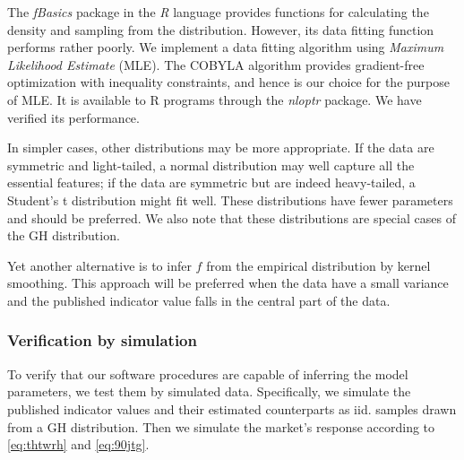 \documentclass[a4paper,11pt,pdftex,twoside,titlepage]{article}
\begin{document}
The {\it fBasics} package in the {\it R} language provides functions for
calculating the density and sampling from the distribution. However,
its data fitting function performs rather poorly. We implement a data
fitting algorithm using {\it Maximum Likelihood Estimate} (MLE). The
COBYLA algorithm provides gradient-free optimization with inequality
constraints, and hence is our choice for the purpose of MLE. It is
available to R programs through the {\it nloptr} package. We have
verified its performance.

In simpler cases, other distributions may be more appropriate. If the
data are symmetric and light-tailed, a normal distribution may well
capture all the essential features; if the data are symmetric but are
indeed heavy-tailed, a Student's t distribution might fit well. These
distributions have fewer parameters and should be preferred. We also
note that these distributions are special cases of the GH distribution.

Yet another alternative is to infer $f$ from the empirical
distribution by kernel smoothing. This approach will be preferred when
the data have a small variance and the published indicator value falls
in the central part of the data.






\subsubsection{Verification by simulation}
To verify that our software procedures are capable of inferring the
model parameters, we test them by simulated data. Specifically, we
simulate the published indicator values and their estimated
counterparts as iid. samples drawn from a GH distribution. Then we
simulate the market's response according to \eqref{eq:thtwrh} and
\eqref{eq:90jtg}.
\end{document}
